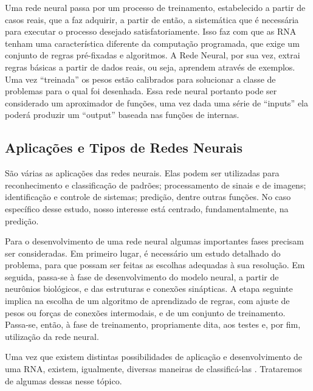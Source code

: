 Uma rede neural passa por um processo de treinamento, estabelecido a partir de casos reais, que a faz adquirir, a partir de então, a sistemática que é necessária para executar o processo desejado satisfatoriamente. Isso faz com que as RNA tenham uma característica diferente da computação programada, que exige um conjunto de regras pré-fixadas e algoritmos. 
A Rede Neural, por sua vez, extrai regras básicas a partir de dados reais, ou seja, aprendem através de exemplos.
Uma vez ``treinada'' os pesos estão calibrados para solucionar a classe de problemas para o qual foi desenhada. Essa rede neural portanto pode ser 
considerado um aproximador de funções, uma vez dada uma série de ``inputs'' ela poderá produzir um ``output'' baseada nas funções de internas.

\subsection{Aplicações e Tipos de Redes Neurais}

São várias as aplicações das redes neurais. Elas podem ser utilizadas para reconhecimento e classificação de padrões;
processamento de sinais e de imagens; identificação e controle de sistemas; predição, dentre outras funções. 
No caso específico desse estudo, nosso interesse está centrado, fundamentalmente, na predição.

Para o desenvolvimento de uma rede neural algumas importantes fases precisam ser consideradas. 
Em primeiro lugar, é necessário um estudo detalhado do problema, para que possam ser feitas as escolhas adequadas à sua resolução. 
Em seguida, passa-se à fase de desenvolvimento do modelo neural, a partir de neurônios biológicos, e das estruturas e conexões sinápticas. 
A etapa seguinte implica na escolha de um algoritmo de aprendizado de regras, com ajuste de pesos ou forças de conexões intermodais, e de um conjunto de treinamento. 
Passa-se, então, à fase de treinamento, propriamente dita, aos testes e, por fim, utilização da rede neural.

Uma vez que existem distintas possibilidades de aplicação e desenvolvimento de uma RNA, existem, igualmente, diversas maneiras de 
classificá-las \cite{AAP}. Trataremos de algumas dessas nesse tópico.

